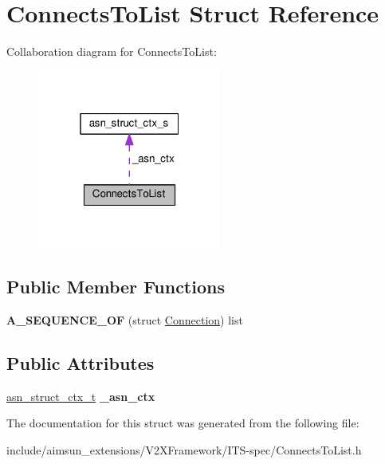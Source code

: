 \hypertarget{structConnectsToList}{}\section{Connects\+To\+List Struct Reference}
\label{structConnectsToList}


Collaboration diagram for Connects\+To\+List\+:\nopagebreak
\begin{figure}[H]
\begin{center}
\leavevmode
\includegraphics[width=172pt]{structConnectsToList__coll__graph}
\end{center}
\end{figure}
\subsection*{Public Member Functions}
\begin{DoxyCompactItemize}
\item 
{\bfseries A\+\_\+\+S\+E\+Q\+U\+E\+N\+C\+E\+\_\+\+OF} (struct \hyperlink{structConnection}{Connection}) list\hypertarget{structConnectsToList_a0b196d741902436143c7428584b9b15e}{}\label{structConnectsToList_a0b196d741902436143c7428584b9b15e}

\end{DoxyCompactItemize}
\subsection*{Public Attributes}
\begin{DoxyCompactItemize}
\item 
\hyperlink{structasn__struct__ctx__s}{asn\+\_\+struct\+\_\+ctx\+\_\+t} {\bfseries \+\_\+asn\+\_\+ctx}\hypertarget{structConnectsToList_afa1418992848f8bb3ad8ce21197e9a23}{}\label{structConnectsToList_afa1418992848f8bb3ad8ce21197e9a23}

\end{DoxyCompactItemize}


The documentation for this struct was generated from the following file\+:\begin{DoxyCompactItemize}
\item 
include/aimsun\+\_\+extensions/\+V2\+X\+Framework/\+I\+T\+S-\/spec/Connects\+To\+List.\+h\end{DoxyCompactItemize}
